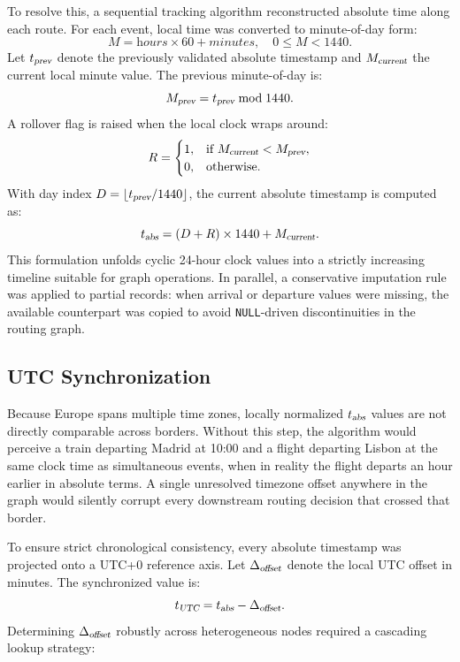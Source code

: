 \medskip

To resolve this, a sequential tracking algorithm reconstructed absolute time along each route. For each event, local time was converted to minute-of-day form:
\[
M = \textit{hours} \times 60 + \textit{minutes}, \quad 0 \le M < 1440.
\]
Let $t_{\textsl{prev}}$ denote the previously validated absolute timestamp and $M_{\textsl{current}}$ the current local minute value. The previous minute-of-day is:
\[
M_{\textsl{prev}} = t_{\textsl{prev}} \bmod 1440.
\]
A rollover flag is raised when the local clock wraps around:
\[
R =
\begin{cases}
1, & \text{if } M_{\textsl{current}} < M_{\textsl{prev}}, \\
0, & \text{otherwise}.
\end{cases}
\]
With day index $D = \lfloor t_{\textsl{prev}} / 1440 \rfloor$, the current absolute timestamp is computed as:
\[
t_{\textsl{abs}} = (D + R)\times 1440 + M_{\textsl{current}}.
\]
This formulation unfolds cyclic 24-hour clock values into a strictly increasing timeline suitable for graph operations. In parallel, a conservative imputation rule was applied to partial records: when arrival or departure values were missing, the available counterpart was copied to avoid \texttt{NULL}-driven discontinuities in the routing graph.

\subsection{UTC Synchronization}
\label{subsec:utc_synchronization}
Because Europe spans multiple time zones, locally normalized $t_{\textsl{abs}}$ values are not directly comparable across borders. Without this step, the algorithm would perceive a train departing Madrid at 10:00 and a flight departing Lisbon at the same clock time as simultaneous events, when in reality the flight departs an hour earlier in absolute terms. A single unresolved timezone offset anywhere in the graph would silently corrupt every downstream routing decision that crossed that border.

\medskip

To ensure strict chronological consistency, every absolute timestamp was projected onto a UTC+0 reference axis. Let $\Delta_{\textsl{offset}}$ denote the local UTC offset in minutes. The synchronized value is:
\[
t_{\textsl{UTC}} = t_{\textsl{abs}} - \Delta_{\textsl{offset}}.
\]
Determining $\Delta_{\textsl{offset}}$ robustly across heterogeneous nodes required a cascading lookup strategy:

